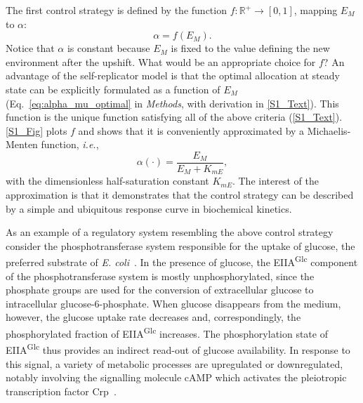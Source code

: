 The first control strategy is defined by the function $f \colon \mathbb{R}^+ \to [0,1]$, mapping $E_M$ to $\alpha$:
\begin{equation}
\alpha = f(E_M).
\label{eq:f}
\end{equation}
Notice that $\alpha$ is constant because $E_M$ is fixed to the value defining the new environment after the upshift.
What would be an appropriate choice for $f$?
An advantage of the self-replicator model is that the optimal allocation at steady state can be explicitly formulated as a function of $E_M$ (Eq.~\ref{eq:alpha_mu_optimal} in \textit{Methods}, with derivation in \ref{S1_Text}).
This function is the unique function satisfying all of the above criteria (\ref{S1_Text}).
\ref{S1_Fig} plots $f$ and shows that it is conveniently approximated by a Michaelis-Menten function, \textit{i.e.},
\begin{equation}\label{eq:MMApprox}
\alpha(\cdot) = \dfrac{E_M}{E_M + K_{mE}},
\end{equation}
with the dimensionless half-saturation constant $K_{mE}$.
The interest of the approximation is that it demonstrates that the control strategy can be described by a simple and ubiquitous response curve in biochemical kinetics.
 
As an example of a regulatory system resembling the above control strategy consider the phosphotransferase system responsible for the uptake of glucose, the preferred substrate of \textit{E. coli}~\cite{deutscher_how_2006}.
In the presence of glucose, the EIIA\textsuperscript{Glc} component of the phosphotransferase system is mostly unphosphorylated, since the phosphate groups are used for the conversion of extracellular glucose to intracellular glucose-6-phosphate.
When glucose disappears from the medium, however, the glucose uptake rate decreases and, correspondingly, the phosphorylated fraction of EIIA\textsuperscript{\textrm{Glc}} increases.
The phosphorylation state of EIIA\textsuperscript{\textrm{Glc}} thus provides an indirect read-out of glucose availability.
In response to this signal, a variety of metabolic processes are upregulated or downregulated, notably involving the signalling molecule cAMP which activates the pleiotropic transcription factor Crp~\cite{deutscher_how_2006,gorke_carbon_2008}.

